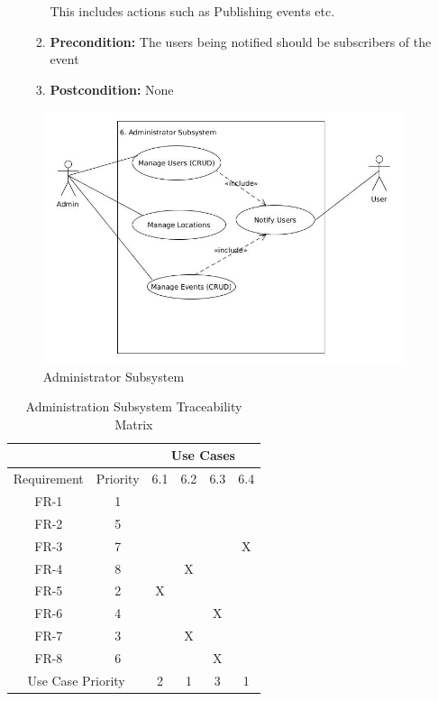 \documentclass{article}
\begin{document}
\begin{enumerate}
\begin{enumerate}
\begin{enumerate}
			This includes actions such as Publishing events etc.
			\item \textbf{Precondition:} The users being notified should be subscribers of the event
			\item \textbf{Postcondition:} None		
		\end{enumerate}		
		
	\end{enumerate}
	\begin{figure}[H]
		\includegraphics[scale=0.5]{Administrator.jpg}
		\caption{Administrator Subsystem}	
	\end{figure} 
				\begin{table}[H]
 \centering
 \caption{Administration Subsystem Traceability Matrix}
 \label{my-label}
 \begin{tabular}{cc|c|c|c|c|}
 \cline{3-6}
                                   &          & \multicolumn{4}{c|}{Use Cases} \\ \hline
 \multicolumn{1}{|c|}{Requirement} & Priority & 6.1    & 6.2   & 6.3   & 6.4   \\ \hline
 \multicolumn{1}{|c|}{FR-1}        & 1        &        &       &       &       \\ \hline
 \multicolumn{1}{|c|}{FR-2}        & 5        &        &       &       &       \\ \hline
 \multicolumn{1}{|c|}{FR-3}        & 7        &        &       &       & X     \\ \hline
 \multicolumn{1}{|c|}{FR-4}        & 8        &        & X     &       &       \\ \hline
 \multicolumn{1}{|c|}{FR-5}        & 2        & X      &       &       &       \\ \hline
 \multicolumn{1}{|c|}{FR-6}        & 4        &        &       & X     &       \\ \hline
 \multicolumn{1}{|c|}{FR-7}        & 3        &        & X     &       &       \\ \hline
 \multicolumn{1}{|c|}{FR-8}        & 6        &        &       & X     &       \\ \hline
 \multicolumn{2}{|c|}{Use Case Priority}      & 2      & 1     & 3     & 1     \\ \hline
 \end{tabular}
 \end{table}


\end{enumerate}
\end{document}
